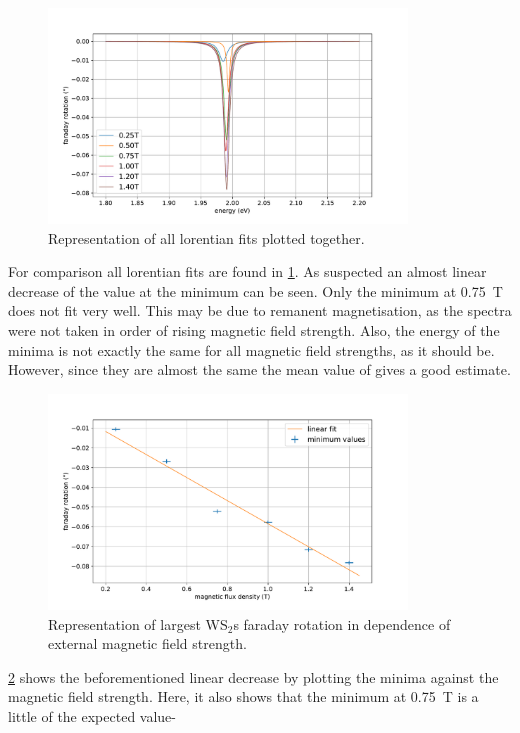 \begin{figure}[!ht]
    \centering
    \includegraphics[width=0.85\textwidth]{plots/WS2_lorentians.pdf}
    \caption{Representation of all lorentian fits plotted together.}
    \label{fig_WS2_lorentians}
\end{figure}
For comparison all lorentian fits are found in \cref{fig_WS2_lorentians}.
As suspected an almost linear decrease of the value at the minimum can be seen.
Only the minimum at \SI{0.75}{\tesla} does not fit very well.
This may be due to remanent magnetisation, as the spectra were not taken in order of rising magnetic field strength.
Also, the energy of the minima is not exactly the same for all magnetic field strengths, as it should be.
However, since they are almost the same the mean value of \SI{}{} gives a good estimate. %

\begin{figure}[!ht]
    \centering
    \includegraphics[width=0.85\textwidth]{plots/WS2_mins.pdf}
    \caption{Representation of largest WS$_2$s faraday rotation in dependence of external magnetic field strength.}
    \label{fig_WS2_minima}
\end{figure}
\cref{fig_WS2_minima} shows the beforementioned linear decrease by plotting the minima against the magnetic field strength.
Here, it also shows that the minimum at \SI{0.75}{\tesla} is a little of the expected value-

